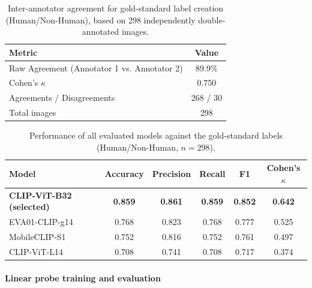 \documentclass[hidelinks, 11pt]{article}
\begin{document}
\begin{table}[htbp]
\centering
\caption{Inter-annotator agreement for gold-standard label creation (Human/Non-Human), based on 298 independently double-annotated images.}
\label{tab:interannotator_humannonhuman}
\begin{tabular}{@{}lc@{}}
\toprule
\textbf{Metric} & \textbf{Value} \\
\midrule
Raw Agreement (Annotator 1 vs. Annotator 2) & 89.9\% \\
Cohen's $\kappa$                             & 0.750 \\
Agreements / Disagreements                    & 268 / 30 \\
Total images                                  & 298 \\
\bottomrule
\end{tabular}
\end{table}

\begin{table}[htbp]
\centering
\caption{Performance of all evaluated models against the gold-standard labels (Human/Non-Human, $n=298$).}
\label{tab:gold_standard_validation_humannonhuman}
\begin{tabular}{@{}lccccc@{}}
\toprule
\textbf{Model} & \textbf{Accuracy} & \textbf{Precision} & \textbf{Recall} & \textbf{F1} & \textbf{Cohen's $\kappa$} \\
\midrule
\textbf{CLIP-ViT-B32 (selected)} & \textbf{0.859} & \textbf{0.861} & \textbf{0.859} & \textbf{0.852} & \textbf{0.642} \\
EVA01-CLIP-g14            & 0.768 & 0.823 & 0.768 & 0.777 & 0.525 \\
MobileCLIP-S1             & 0.752 & 0.816 & 0.752 & 0.761 & 0.497 \\
CLIP-ViT-L14              & 0.708 & 0.741 & 0.708 & 0.717 & 0.374 \\
\bottomrule
\end{tabular}
\end{table}

\paragraph{Linear probe training and evaluation}
\end{document}
